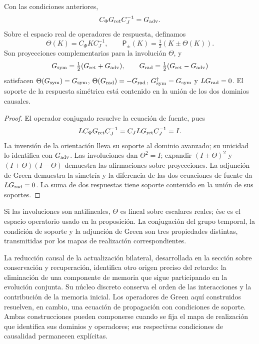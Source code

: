 \begin{proposition}
\label{x_reciprocidad:vii:prop:green-paridades}
Con las condiciones anteriores,
\[
 C_\Phi G_{\rm ret}C_J^{-1}=G_{\rm adv}.
\]
Sobre el espacio real de operadores de respuesta, definamos
\[
 \Theta(K)=C_\Phi K C_J^{-1},\qquad
 \mathsf P_\pm(K)=\tfrac12(K\pm\Theta(K)).
\]
Son proyecciones complementarias para la involución \(\Theta\), y
\begin{equation}
 G_{\rm sym}=\tfrac12(G_{\rm ret}+G_{\rm adv}),\qquad
 G_{\rm rad}=\tfrac12(G_{\rm ret}-G_{\rm adv})
 \label{x_reciprocidad:vii:eq:descomposicion-green}
\end{equation}
satisfacen \(\Theta(G_{\rm sym})=G_{\rm sym}\),
\(\Theta(G_{\rm rad})=-G_{\rm rad}\),
\(G_{\rm sym}^{\dagger}=G_{\rm sym}\) y
\(LG_{\rm rad}=0\). El soporte de la respuesta simétrica está contenido
en la unión de los dos dominios causales.
\end{proposition}
\begin{proof}
El operador conjugado resuelve la ecuación de fuente, pues
\[
 LC_\Phi G_{\rm ret}C_J^{-1}=C_JLG_{\rm ret}C_J^{-1}=I.
\]
La inversión de la orientación lleva su soporte al dominio avanzado;
su unicidad lo identifica con \(G_{\rm adv}\). Las involuciones dan
\(\Theta^2=I\); expandir \((I\pm\Theta)^2\) y
\((I+\Theta)(I-\Theta)\) demuestra las afirmaciones sobre proyecciones.
La adjunción de Green demuestra la simetría y la diferencia de las dos
ecuaciones de fuente da \(LG_{\rm rad}=0\). La suma de dos respuestas
tiene soporte contenido en la unión de sus soportes.
\end{proof}

Si las involuciones son antilineales, \(\Theta\) es lineal sobre
escalares reales; ése es el espacio operatorio usado en la proposición.
La conjugación del grupo temporal, la condición de soporte y la
adjunción de Green son tres propiedades distintas, transmitidas por los
mapas de realización correspondientes.

La reducción causal de la actualización bilateral, desarrollada en la
sección sobre conservación y recuperación, identifica otro origen preciso
del retardo: la eliminación de una componente de memoria que sigue
participando en la evolución conjunta. Su núcleo discreto conserva el
orden de las interacciones y la contribución de la memoria inicial.
Los operadores de Green aquí construidos resuelven, en cambio, una
ecuación de propagación con condiciones de soporte. Ambas construcciones
pueden componerse cuando se fija el mapa de realización que identifica
sus dominios y operadores; sus respectivas condiciones de causalidad
permanecen explícitas.


